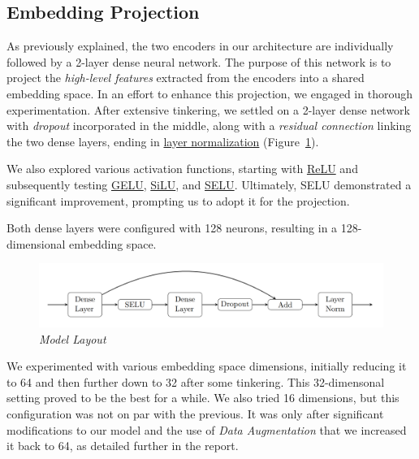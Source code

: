 \documentclass[10pt,twocolumn,letterpaper]{article}
\begin{document}
\subsection{Embedding Projection}
As previously explained, the two encoders in our architecture are individually followed by a 2-layer dense neural network. The purpose of this network is to project the \textit{high-level features} extracted from the encoders into a shared embedding space.
In an effort to enhance this projection, we engaged in thorough experimentation.
After extensive tinkering, we settled on a 2-layer dense network with \textit{dropout} incorporated in the middle, along with a \textit{residual connection} linking the two dense layers, ending in \href{https://keras.io/api/layers/normalization_layers/layer_normalization/}{layer normalization} (Figure\ \ref{fig:ml}).

We also explored various activation functions, starting with \href{https://keras.io/api/layers/activation_layers/relu/}{ReLU} and subsequently testing \href{https://www.tensorflow.org/api_docs/python/tf/keras/activations/gelu}{GELU}, \href{https://www.tensorflow.org/api_docs/python/tf/nn/silu}{SiLU}, and \href{https://www.tensorflow.org/api_docs/python/tf/nn/selu}{SELU}. Ultimately, SELU demonstrated a significant improvement, prompting us to adopt it for the projection.

Both dense layers were configured with 128 neurons, resulting in a 128-dimensional embedding space.

\begin{figure}[h]
   \centering
   \includegraphics[width=1\linewidth]{img/Tikz_Model.png}
   \caption{\textit{Model Layout}}
   \label{fig:ml}
\end{figure}  

We experimented with various embedding space dimensions, initially reducing it to 64 and then further down to 32 after some tinkering. This 32-dimensonal setting proved to be the best for a while. We also tried 16 dimensions, but this configuration was not on par with the previous. It was only after significant modifications to our model and the use of \textit{Data Augmentation} that we increased it back to 64, as detailed further in the report.
\end{document}

